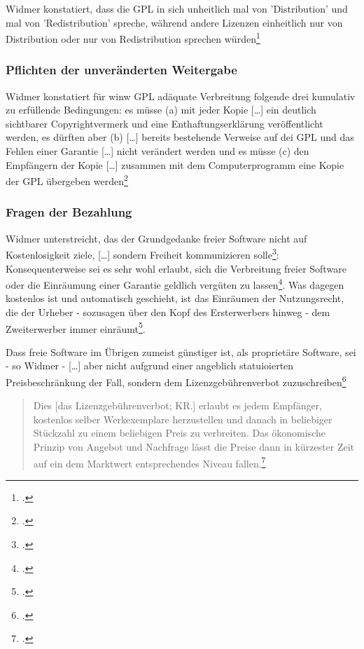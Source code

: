 \documentclass[DIV=calc,BCOR=5mm,11pt,headings=small,oneside,abstract=true, toc=bib]{scrartcl}
\begin{document}
Widmer konstatiert, dass die GPL in sich unheitlich mal von 'Distribution' und
mal von 'Redistribution' spreche, während andere Lizenzen einheitlich nur von
Distribution oder nur von Redistribution sprechen
würden\footcite[vgl.][117 Anm 552]{Widmer2003a}


\subsubsection{Pflichten der unveränderten Weitergabe}

Widmer konstatiert für winw GPL adäquate \glqq{}Verbreitung\grqq{} folgende
\glqq{}drei kumulativ zu erfüllende Bedingungen\grqq{}: es müsse (a)
\glqq{}mit jeder Kopie [\ldots] ein deutlich sichtbarer Copyrightvermerk
und eine Enthaftungserklärung veröffentlicht werden\grqq{}, es dürften aber (b)
\glqq{}[\ldots] bereits bestehende Verweise auf dei GPL und das Fehlen
einer Garantie [\ldots] nicht verändert werden\grqq{} und es müsse (c)
\glqq{}den Empfängern der Kopie [\ldots] zusammen mit dem
Computerprogramm eine Kopie der GPL übergeben
werden\grqq{}\footcite[vgl.][127f]{Widmer2003a}

\subsubsection{Fragen der Bezahlung}
Widmer unterstreicht, das der \glqq{}Grundgedanke freier Software\grqq{} nicht
auf \glqq{}Kostenlosigkeit\grqq{} ziele, \glqq{}[\ldots] sondern Freiheit
kommunizieren solle\grqq{}\footcite[vgl.][131]{Widmer2003a}: Konsequenterweise
sei es sehr wohl erlaubt, sich die \glqq{}Verbreitung freier Software\grqq{}
oder die \glqq{}Einräumung einer Garantie\grqq{} geldlich vergüten zu
lassen\footcite[vgl.][131]{Widmer2003a}. Was dagegen kostenlos ist und
automatisch geschieht, ist das \glqq{}Einräumen der Nutzungsrecht\grqq{}, die
der Urheber - sozusagen über den Kopf des \glqq{}Ersterwerbers\grqq{} hinweg -
dem \glqq{}Zweiterwerber\grqq{} immer
einräumt\footcite[vgl.][131f]{Widmer2003a}.

Dass freie Software im Übrigen zumeist günstiger ist, als proprietäre Software,
sei - so Widmer - \glqq{}[\ldots] aber nicht aufgrund einer angeblich
statuioierten Preisbeschränkung der Fall, sondern dem
Lizenzgebührenverbot zuzuschreiben\grqq{}\footcite[vgl.][132]{Widmer2003a}

\begin{quote} \glqq{}Dies [das Lizenzgebührenverbot; KR.] erlaubt es
jedem Empfänger, kostenlos selber Werkexemplare herzustellen und danach
in beliebiger Stückzahl zu einem beliebigen Preis zu verbreiten. Das
ökonomische Prinzip von Angebot und Nachfrage lässt die Preise dann in
kürzester Zeit auf ein dem Marktwert entsprechendes Niveau
fallen.\grqq{}\footcite[][132]{Widmer2003a}
\end{quote}
\end{document}
